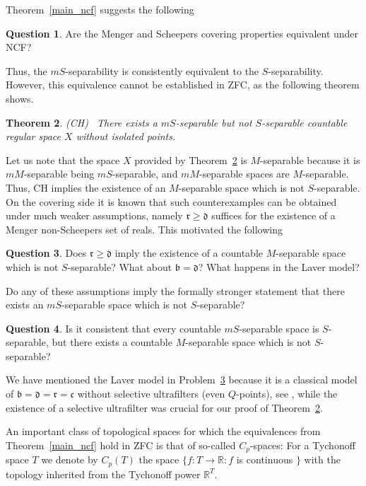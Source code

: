\documentclass[12pt,a4paper]{amsart}
\newtheorem{theorem}{Theorem}[section]
\theoremstyle{definition}
\newtheorem{question}[theorem]{Question}
\newcommand{\hot}{\mathfrak}
\begin{document}
Theorem~\ref{main_ncf} suggests the following 

\begin{question}
Are the Menger and Scheepers covering properties equivalent under NCF?
\end{question}



Thus, the $mS$-separability is consistently equivalent to 
the $S$-separability. However, this equivalence cannot be established in ZFC, as the following theorem shows. 

\begin{theorem} \label{main_mS_vs_S}
(CH) \ There exists a $mS$-separable but not $S$-separable countable regular space $X$ without isolated points. 
\end{theorem}


Let us note that the space $X$ provided by Theorem~\ref{main_mS_vs_S}
is $M$-separable because it is $mM$-separable being $mS$-separable, and
$mM$-separable spaces are $M$-separable. Thus, CH implies the existence of
an $M$-separable space which is not $S$-separable. On the covering side 
it is known \cite[Theorem~2.1]{SzeTsaZdo21} that such counterexamples can be obtained 
under much weaker assumptions, namely $\hot r\geq \hot d$ suffices 
for the existence of a Menger non-Scheepers set of reals.
This motivated the following 

\begin{question} \label{pr01}
Does $\hot r\geq\hot d$ imply the existence of
a countable $M$-separable space which is not $S$-separable? What about 
$\hot b=\hot d$? What happens in the Laver model?

{Do} any of these assumptions imply the formally stronger statement that there exists an $mS$-separable space
which is not $S$-separable?
\end{question}

\begin{question}
Is it consistent that every countable $mS$-separable space is $S$-separable, but 
there exists a countable $M$-separable space which is not $S$-separable?
\end{question}

We have  mentioned the Laver model in Problem~\ref{pr01}
because it is a classical model of $\hot b=\hot d=\hot r=\hot c$
 without selective  ultrafilters (even $Q$-points), see \cite{Mil80},
while the existence of a selective ultrafilter was crucial for our proof of 
Theorem~\ref{main_mS_vs_S}.


An important class of topological spaces for which the equivalences from 
Theorem~\ref{main_ncf} hold in ZFC is that of so-called $C_p$-spaces:
For a Tychonoff space $T$ we denote by $C_p(T)$ the space 
$\{f:T\to\mathbb R:f$ is continuous $\}$ with the topology inherited from 
the Tychonoff power $\mathbb R^T$.
\end{document}

